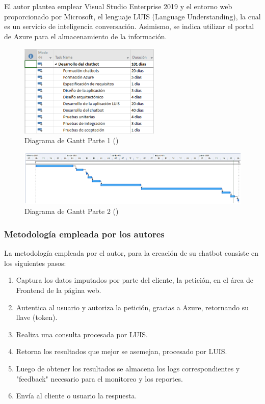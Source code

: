El autor plantea emplear Visual Studio Enterprise 2019 y el entorno web proporcionado por Microsoft, el lenguaje LUIS (Language Understanding), la cual es un servicio de inteligencia conversación. Asimismo, se indica utilizar el portal de Azure para el almacenamiento de la información.

\begin{figure}[h]
	\begin{center}
		\includegraphics[width=0.6\textwidth]{2/figures/2_1.png}
		\caption{Diagrama de Gantt \- Parte 1 (\cite{ts_ICAITD})}
	\end{center}
\end{figure}

\begin{figure}[h]
	\begin{center}
		\includegraphics[width=1\textwidth]{2/figures/2_2.png}
		\caption{Diagrama de Gantt \- Parte 2 (\cite{ts_ICAITD})}
	\end{center}
\end{figure}


\subsubsection{Metodología empleada por los autores}
La metodología empleada por el autor, para la creación de su chatbot consiste en los siguientes pasos: 

\begin{enumerate}
    \item Captura los datos imputados por parte del cliente, la petición, en el área de Frontend de la página web.
    \item Autentica al usuario y autoriza la petición, gracias a Azure, retornando su llave (token).
    \item Realiza una consulta procesada por LUIS.
    \item Retorna los resultados que mejor se asemejan, procesado por LUIS.
    \item Luego de obtener los resultados se almacena los logs correspondientes  y "feedback" necesario para el monitoreo y los reportes.
    \item Envía al cliente o usuario la respuesta.
\end{enumerate}

